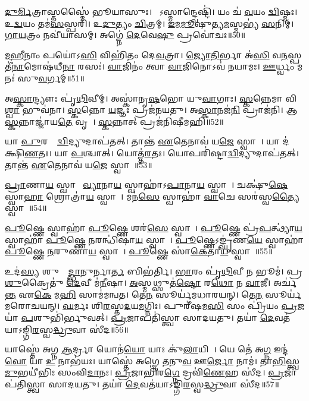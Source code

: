 \ul{𑌦𑍁}\ul{𑌰𑍍𑌮𑌿}𑌤𑍍𑌰𑌾𑌸𑍍𑌤𑌸𑍍𑌮𑍈॑ 𑌭𑍂𑌯𑌾𑌸𑍁𑌃। 
𑌯𑍋᳚𑌽𑌸𑍍𑌮𑌾𑌨𑍍𑌦𑍍𑌵𑍇𑌷𑍍𑌟𑌿॑। 
𑌯𑌂 𑌚॑ \ul{𑌵}𑌯𑌂 \ul{𑌦𑍍𑌵𑌿}𑌷𑍍𑌮𑌃। 
𑌉\ul{𑌦𑍍𑌵}𑌯𑌂 𑌤𑌮॑\ul{𑌸}𑌸𑍍𑌪𑌰𑌿॑। 
𑌉\ul{𑌦𑍁}𑌤𑍍𑌯𑌂 \ul{𑌚𑌿}𑌤𑍍𑌰𑌮𑍍। 
\ul{𑌇}𑌮\ul{𑌮𑍂}𑌷𑍁𑌤𑍍𑌯\ul{𑌮}𑌸𑍍𑌮𑌭𑍍𑌯॑ \ul{𑌸}𑌨𑌿𑌮𑍍। 
\ul{𑌗𑌾}\ul{𑌯}𑌤𑍍𑌰𑌂 𑌨𑌵𑍀॑𑌯𑌾𑌸𑌮𑍍। 
𑌅𑌗𑍍𑌨𑍇॑ \ul{𑌦𑍇}𑌵𑍇\ul{𑌷𑍁} 𑌪𑍍𑌰𑌵𑍋॑𑌚𑌃॥50॥
\anuvakamend[𑌯𑌾𑌽𑌽𑌗𑍍𑌨𑍀᳚\ul{𑌧𑍍𑌰𑍇} 𑌤𑌾𑌨𑍍𑌤॑ \ul{𑌏}𑌤𑍇𑌨𑌾𑌵॑ 𑌯\ul{𑌜𑍇} 𑌸𑍍𑌵𑌾\ul{𑌹𑌾} 𑌧𑌰𑍍𑌮॑𑌣𑌾 \ul{𑌶𑌂} 𑌯𑍁𑌧𑌾॑𑌯𑌾𑌃 𑌪𑍍𑌯𑌾𑌸𑌿\ul{𑌷𑍀}𑌮\ul{𑌹𑌿} 𑌪𑍋𑌷𑍇॑\ul{𑌣} 𑌨𑌿𑌷॑𑌤𑍍𑌤𑍋 \ul{𑌵𑌿}𑌦𑍍𑌮 𑌸॑\ul{𑌨𑍍𑌤𑍍𑌵}𑌷𑍍𑌟𑍗]

\ul{𑌮}\ul{𑌹𑍀}𑌨𑌾𑌂 𑌪𑌯𑍋॑𑌽\ul{𑌸𑌿} 𑌵𑌿𑌹𑌿॑𑌤𑌂 𑌦𑍇\ul{𑌵}𑌤𑍍𑌰𑌾। 
\ul{𑌜𑍍𑌯𑍋}\ul{𑌤𑌿}𑌰𑍍𑌭𑌾 𑌅॑\ul{𑌸𑌿} 𑌵\ul{𑌨}𑌸𑍍𑌪𑌤𑍀॑\ul{𑌨𑌾}\-𑌮𑍋𑌷॑𑌧𑍀\ul{𑌨𑌾}\ul{} 𑌰𑌸𑌃॑। 
\ul{𑌵𑌾}𑌜𑌿𑌨𑌂॑ 𑌤𑍍𑌵𑌾 \ul{𑌵𑌾}𑌜𑌿𑌨𑍋𑌽𑌵॑ 𑌨𑌯𑌾𑌮𑌃। 
\ul{𑌊}𑌰𑍍𑌧𑍍𑌵𑌂 𑌮𑌨𑌃॑ 𑌸𑍁\ul{𑌵}𑌰𑍍𑌗𑌮𑍍॥51॥
\anuvakamend

𑌅\ul{𑌸𑍍𑌕𑌾}𑌨𑍍𑌦𑍍𑌯𑍗𑌃 𑌪𑍃॑\ul{𑌥𑌿}𑌵𑍀𑌮𑍍। 
𑌅𑌸𑍍𑌕𑌾॑𑌨𑍃\ul{𑌷}𑌭𑍋 𑌯𑍁\ul{𑌵𑌾}𑌗𑌾𑌃। 
\ul{𑌸𑍍𑌕}𑌨𑍍𑌨𑍇𑌮𑌾 𑌵𑌿\ul{𑌶𑍍𑌵𑌾} 𑌭𑍁𑌵॑𑌨𑌾। 
\ul{𑌸𑍍𑌕}𑌨𑍍𑌨𑍋 \ul{𑌯}𑌜𑍍𑌞𑌃 𑌪𑍍𑌰𑌜॑𑌨𑌯𑌤𑍁। 
𑌅\ul{𑌸𑍍𑌕𑌾}𑌨𑌜॑\ul{𑌨𑌿} 𑌪𑍍𑌰𑌾𑌜॑𑌨𑌿। 
𑌆 \ul{𑌸𑍍𑌕}𑌨𑍍𑌨𑌾𑌜𑍍𑌜𑌾॑𑌯\ul{𑌤𑍇} 𑌵𑍃𑌷𑌾᳚। 
\ul{𑌸𑍍𑌕}𑌨𑍍𑌨𑌾𑌤𑍍 𑌪𑍍𑌰𑌜॑𑌨𑌿𑌷𑍀𑌮𑌹𑌿॥52॥
\anuvakamend

𑌯𑌾 \ul{𑌪𑍁}𑌰𑌸𑍍𑌤𑌾᳚\ul{𑌦𑍍𑌵𑌿}𑌦𑍍𑌯𑍁𑌦𑌾𑌪॑𑌤𑌤𑍍। 
𑌤𑌾𑌨𑍍𑌤॑ \ul{𑌏}𑌤𑍇𑌨𑌾𑌵॑ 𑌯\ul{𑌜𑍇} 𑌸𑍍𑌵𑌾𑌹𑌾᳚। 
𑌯𑌾 𑌦॑𑌕𑍍𑌷𑌿\ul{𑌣}𑌤𑌃। 
𑌯𑌾 \ul{𑌪}𑌶𑍍𑌚𑌾𑌤𑍍। 
𑌯𑍋𑌤𑍍𑌤॑\ul{𑌰}𑌤𑌃। 
𑌯𑍋𑌪𑌰𑌿॑𑌷𑍍𑌟𑌾\ul{𑌦𑍍𑌵𑌿}𑌦𑍍𑌯𑍁𑌦𑌾𑌪॑𑌤𑌤𑍍। 
𑌤𑌾𑌨𑍍𑌤॑ \ul{𑌏}𑌤𑍇𑌨𑌾𑌵॑ 𑌯\ul{𑌜𑍇} 𑌸𑍍𑌵𑌾𑌹𑌾᳚॥53॥
\anuvakamend

\ul{𑌪𑍍𑌰𑌾}𑌣𑌾\ul{𑌯} 𑌸𑍍𑌵𑌾𑌹𑌾᳚ \ul{𑌵𑍍𑌯𑌾}𑌨𑌾\ul{𑌯} 𑌸𑍍𑌵𑌾𑌹𑌾॑𑌽\ul{𑌪𑌾}𑌨𑌾\ul{𑌯} 𑌸𑍍𑌵𑌾𑌹𑌾᳚। 
𑌚𑌕𑍍𑌷𑍁॑\ul{𑌷𑍇} 𑌸𑍍𑌵𑌾\ul{𑌹𑌾} 𑌶𑍍𑌰𑍋𑌤𑍍𑌰𑌾॑\ul{𑌯} 𑌸𑍍𑌵𑌾𑌹𑌾᳚। 
𑌮𑌨॑\ul{𑌸𑍇} 𑌸𑍍𑌵𑌾𑌹𑌾॑ \ul{𑌵𑌾}𑌚𑍇 𑌸𑌰॑𑌸𑍍𑌵\ul{𑌤𑍍𑌯𑍈} 𑌸𑍍𑌵𑌾𑌹𑌾᳚॥54॥%
\anuvakamend

\ul{𑌪𑍂}𑌷𑍍𑌣𑍇 𑌸𑍍𑌵𑌾𑌹𑌾॑ \ul{𑌪𑍂}𑌷𑍍𑌣𑍇 𑌶𑌰॑\ul{𑌸𑍇} 𑌸𑍍𑌵𑌾𑌹𑌾᳚। 
\ul{𑌪𑍂}𑌷𑍍𑌣𑍇 𑌪𑍍𑌰॑\ul{𑌪}𑌤𑍍𑌥𑍍𑌯𑌾॑\ul{𑌯} 𑌸𑍍𑌵𑌾𑌹𑌾॑ \ul{𑌪𑍂}𑌷𑍍𑌣𑍇 \ul{𑌨}𑌰𑌨𑍍𑌧𑌿॑𑌷𑌾\ul{𑌯} 𑌸𑍍𑌵𑌾𑌹𑌾᳚। 
\ul{𑌪𑍂}𑌷𑍍𑌣𑍇𑌽𑌙𑍍𑌘𑍃॑𑌣\ul{𑌯𑍇} 𑌸𑍍𑌵𑌾𑌹𑌾॑ \ul{𑌪𑍂}𑌷𑍍𑌣𑍇 \ul{𑌨}𑌰𑍁𑌣𑌾॑\ul{𑌯} 𑌸𑍍𑌵𑌾𑌹𑌾᳚। 
\ul{𑌪𑍂}𑌷𑍍𑌣𑍇 𑌸𑌾॑\ul{𑌕𑍇}𑌤𑌾\ul{𑌯} 𑌸𑍍𑌵𑌾𑌹𑌾᳚॥55॥
\anuvakamend


𑌉𑌦॑\ul{𑌸𑍍𑌯} 𑌶𑍁𑌷𑍍𑌮𑌾᳚\ul{𑌦𑍍𑌭𑌾}𑌨𑍁𑌰𑍍𑌨𑌾\ul{𑌰𑍍𑌤} 𑌬𑌿𑌭॑𑌰𑍍𑌤𑌿। 
\ul{𑌭𑌾}𑌰𑌂 𑌪𑍃॑\ul{𑌥𑌿}𑌵𑍀 𑌨 𑌭𑍂𑌮॑। 
𑌪𑍍𑌰 \ul{𑌶𑍁}𑌕𑍍𑌰𑍈𑌤𑍁॑ \ul{𑌦𑍇}𑌵𑍀 𑌮॑\ul{𑌨𑍀}𑌷𑌾। 
\ul{𑌅}𑌸𑍍𑌮𑌥𑍍𑌸𑍁𑌤॑\ul{𑌷𑍍𑌟𑍋} 𑌰\ul{𑌥𑍋} 𑌨 \ul{𑌵𑌾}𑌜𑍀। 
𑌅𑌰𑍍𑌚॑\ul{𑌨𑍍𑌤} 𑌏\ul{𑌕𑍇} 𑌮\ul{𑌹𑌿} 𑌸𑌾𑌮॑𑌮𑌨𑍍𑌵𑌤। 
𑌤𑍇\ul{𑌨} 𑌸𑍂𑌰𑍍𑌯॑𑌮𑌧𑌾𑌰𑌯𑌨𑍍। 
𑌤𑍇\ul{𑌨} 𑌸𑍂𑌰𑍍𑌯॑𑌮𑌰𑍋𑌚𑌯𑌨𑍍। 
\ul{𑌘}𑌰𑍍𑌮𑌃  𑌶𑌿\ul{𑌰}𑌸𑍍𑌤\ul{𑌦}𑌯\ul{𑌮}𑌗𑍍𑌨𑌿𑌃। 
𑌪𑍁𑌰𑍀॑𑌷𑌮\ul{𑌸𑌿} 𑌸𑌂 𑌪𑍍𑌰𑌿॑𑌯𑌂 \ul{𑌪𑍍𑌰}𑌜𑌯𑌾॑ \ul{𑌪}𑌶𑍁𑌭𑌿॑𑌰𑍍𑌭𑍁𑌵𑌤𑍍। 
\ul{𑌪𑍍𑌰}𑌜𑌾𑌪𑌤𑌿॑𑌸𑍍𑌤𑍍𑌵𑌾 𑌸𑌾𑌦𑌯𑌤𑍁। 
𑌤𑌯𑌾॑ \ul{𑌦𑍇}𑌵𑌤॑𑌯𑌾𑌽𑌙𑍍𑌗𑌿\ul{𑌰}𑌸𑍍𑌵\ul{𑌦𑍍𑌧𑍍𑌰𑍁}𑌵𑌾 𑌸𑍀॑𑌦॥56॥
\anuvakamend

𑌯𑌾𑌸𑍍𑌤𑍇॑ 𑌅𑌗𑍍𑌨 \ul{𑌆}𑌰𑍍𑌦𑍍𑌰𑌾 𑌯𑍋𑌨॑\ul{𑌯𑍋} 𑌯𑌾𑌃 𑌕𑍁॑\ul{𑌲𑌾}𑌯𑌿𑌨𑍀𑌃᳚। 
𑌯𑍇 𑌤𑍇॑ 𑌅\ul{𑌗𑍍𑌨} 𑌇𑌨𑍍𑌦॑\ul{𑌵𑍋} 𑌯𑌾 \ul{𑌉} 𑌨𑌾𑌭॑𑌯𑌃। 
𑌯𑌾𑌸𑍍𑌤𑍇॑ 𑌅𑌗𑍍𑌨𑍇 \ul{𑌤}𑌨𑍁\ul{𑌵} 𑌊\ul{𑌰𑍍𑌜𑍋} 𑌨𑌾𑌮॑। 
𑌤𑌾\ul{𑌭𑌿}𑌸𑍍𑌤𑍍𑌵\ul{𑌮𑍁}𑌭𑌯𑍀॑𑌭𑌿𑌃 𑌸𑌂𑌵𑌿\ul{𑌦𑌾}𑌨𑌃। 
\ul{𑌪𑍍𑌰}𑌜𑌾𑌭𑌿॑𑌰\ul{𑌗𑍍𑌨𑍇} 𑌦𑍍𑌰𑌵𑌿॑\ul{𑌣𑍇}𑌹 𑌸𑍀॑𑌦। 
\ul{𑌪𑍍𑌰}𑌜𑌾𑌪॑𑌤𑌿𑌸𑍍𑌤𑍍𑌵𑌾 𑌸𑌾𑌦𑌯𑌤𑍁। 
𑌤𑌯𑌾॑ \ul{𑌦𑍇}𑌵𑌤॑𑌯𑌾𑌽𑌙𑍍𑌗𑌿\ul{𑌰}𑌸𑍍𑌵\ul{𑌦𑍍𑌧𑍍𑌰𑍁}𑌵𑌾 𑌸𑍀॑𑌦॥57॥
\anuvakamend

